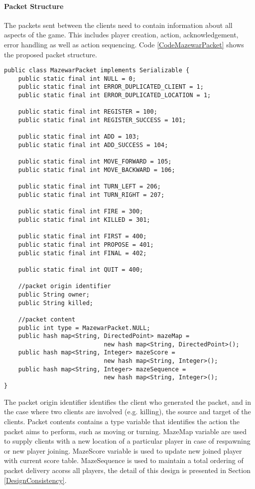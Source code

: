 \paragraph*{Packet Structure} The packets sent between the clients need to contain information about all aspects of the game. This includes player creation, action, acknowledgement, error handling as well as action sequencing. Code \ref{CodeMazewarPacket} shows the proposed packet structure. 
\newpage
{
\singlespacing
\begin{lstlisting}[caption = {[MazewarPacket.java]Structure of packets exchanged between players}, label = CodeMazewarPacket]
public class MazewarPacket implements Serializable {
    public static final int NULL = 0;
    public static final int ERROR_DUPLICATED_CLIENT = 1;
    public static final int ERROR_DUPLICATED_LOCATION = 1;

    public static final int REGISTER = 100;
    public static final int REGISTER_SUCCESS = 101;

    public static final int ADD = 103;
    public static final int ADD_SUCCESS = 104;

    public static final int MOVE_FORWARD = 105;
    public static final int MOVE_BACKWARD = 106;

    public static final int TURN_LEFT = 206;
    public static final int TURN_RIGHT = 207;

    public static final int FIRE = 300;
    public static final int KILLED = 301;

    public static final int FIRST = 400;
    public static final int PROPOSE = 401;
    public static final int FINAL = 402;

    public static final int QUIT = 400;

    //packet origin identifier
    public String owner;
    public String killed;

	//packet content
    public int type = MazewarPacket.NULL;
    public hash map<String, DirectedPoint> mazeMap = 
    						new hash map<String, DirectedPoint>();
    public hash map<String, Integer> mazeScore = 
    						new hash map<String, Integer>();
    public hash map<String, Integer> mazeSequence = 
    						new hash map<String, Integer>();
}
\end{lstlisting}
}

The packet origin identifier identifies the client who generated the packet, and in the case where two clients are involved (e.g. killing), the source and target of the clients. Packet contents contains a type variable that identifies the action the packet aims to perform, such as moving or turning. MazeMap variable are used to supply clients with a new location of a particular player in case of respawning or new player joining. MazeScore variable is used to update new joined player with current score table. MazeSequence is used to maintain a total ordering of packet delivery acorss all players, the detail of this design is presented in Section \ref{DesignConsistency}.

